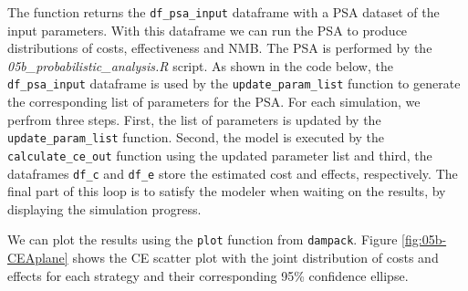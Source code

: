 \documentclass[]{book}
\newenvironment{Shaded}{\begin{snugshade}}{\end{snugshade}}
\newcommand{\CharTok}[1]{\textcolor[rgb]{0.31,0.60,0.02}{#1}}
\newcommand{\CommentTok}[1]{\textcolor[rgb]{0.56,0.35,0.01}{\textit{#1}}}
\newcommand{\ControlFlowTok}[1]{\textcolor[rgb]{0.13,0.29,0.53}{\textbf{#1}}}
\newcommand{\DataTypeTok}[1]{\textcolor[rgb]{0.13,0.29,0.53}{#1}}
\newcommand{\DecValTok}[1]{\textcolor[rgb]{0.00,0.00,0.81}{#1}}
\newcommand{\KeywordTok}[1]{\textcolor[rgb]{0.13,0.29,0.53}{\textbf{#1}}}
\newcommand{\NormalTok}[1]{#1}
\newcommand{\OperatorTok}[1]{\textcolor[rgb]{0.81,0.36,0.00}{\textbf{#1}}}
\newcommand{\StringTok}[1]{\textcolor[rgb]{0.31,0.60,0.02}{#1}}
\begin{document}
The function returns the \texttt{df\_psa\_input} dataframe with a PSA dataset of the input parameters. With this dataframe we can run the PSA to produce distributions of costs, effectiveness and NMB. The PSA is performed by the \emph{05b\_probabilistic\_analysis.R} script. As shown in the code below, the \texttt{df\_psa\_input} dataframe is used by the \texttt{update\_param\_list} function to generate the corresponding list of parameters for the PSA. For each simulation, we perfrom three steps. First, the list of parameters is updated by the \texttt{update\_param\_list} function. Second, the model is executed by the \texttt{calculate\_ce\_out} function using the updated parameter list and third, the dataframes \texttt{df\_c} and \texttt{df\_e} store the estimated cost and effects, respectively. The final part of this loop is to satisfy the modeler when waiting on the results, by displaying the simulation progress.

\begin{Shaded}
\end{Shaded}

We can plot the results using the \texttt{plot} function from \texttt{dampack}. Figure \ref{fig:05b-CEAplane} shows the CE scatter plot with the joint distribution of costs and effects for each strategy and their corresponding 95\% confidence ellipse.
\end{document}
